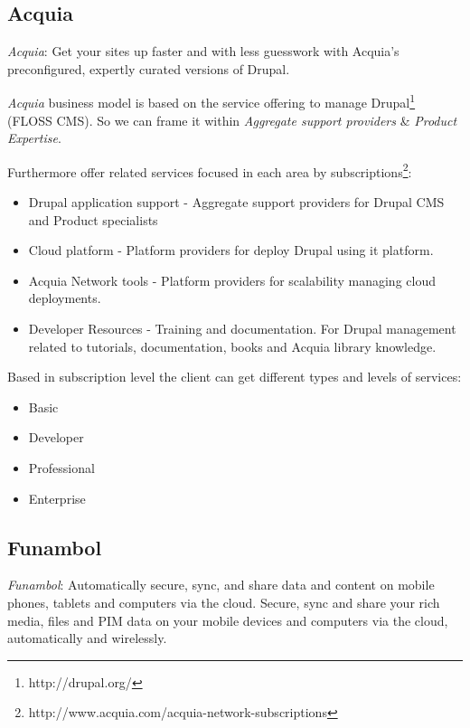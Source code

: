 \documentclass[11pt]{scrartcl}
\begin{document}
\subsection{Acquia}

\par \emph{Acquia}: Get your sites up faster and with less guesswork with Acquia’s preconfigured, expertly curated versions of Drupal.

\par \emph{Acquia} business model is based on the service offering to manage Drupal\footnote{http://drupal.org/} (FLOSS CMS). So we can frame it within \emph{Aggregate support providers} \& \emph{Product Expertise}.

Furthermore offer related services focused in each area by subscriptions\footnote{http://www.acquia.com/acquia-network-subscriptions}:

\begin{itemize}
	\item Drupal application support - Aggregate support providers for Drupal CMS and Product specialists
	\item Cloud platform - Platform providers for deploy Drupal using it platform.
	\item Acquia Network tools - Platform providers for scalability managing cloud deployments.
	\item Developer Resources - Training and documentation. For Drupal management related to tutorials, documentation, books and Acquia library knowledge.
\end{itemize}

\par Based in subscription level the client can get different types and levels of services:

\begin{itemize}
	\item Basic
	\item Developer
	\item Professional
	\item Enterprise
\end{itemize}

\subsection{Funambol}

\par \emph{Funambol}: Automatically secure, sync, and share data and content on mobile phones, tablets and computers via the cloud. Secure, sync and share your rich media, files and PIM data on your mobile devices and computers via the cloud, automatically and wirelessly.
\end{document}
